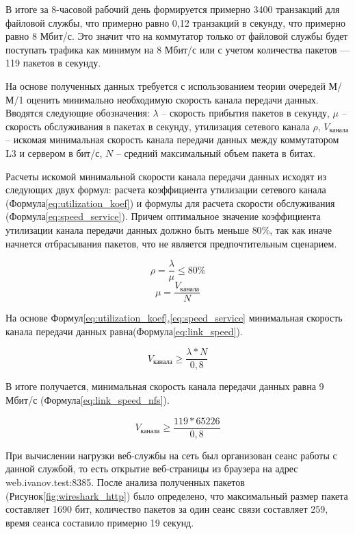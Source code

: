 \documentclass[14pt, a4paper]{extarticle}
\begin{document}
В итоге за 8-часовой рабочий день формируется примерно 3400 транзакций
для файловой службы, что примерно равно 0,12 транзакций в секунду, что
примерно равно 8 Мбит/с. Это значит что на коммутатор только от
файловой службы будет поступать трафика как минимум на 8 Мбит/с или с
учетом количества пакетов --- 119 пакетов в секунду.

На основе полученных данных требуется с использованием теории очередей
М/М/1\cite{query-theory} оценить минимально необходимую скорость
канала передачи данных.  Вводятся следующие обозначения: $\lambda$ –
скорость прибытия пакетов в секунду, $\mu$ – скорость обслуживания в
пакетах в секунду, утилизация сетевого канала $\rho$,
$V_\text{канала}$ – искомая минимальная скорость канала передачи
данных между коммутатором L3 и сервером в бит/с, $N$ – средний
максимальный объем пакета в битах.

Расчеты искомой минимальной скорости канала передачи данных исходят из
следующих двух формул: расчета коэффициента утилизации сетевого
канала (Формула\;\ref{eq:utilization_koef}) и формулы для расчета
скорости обслуживания (Формула\;\ref{eq:speed_service}). Причем
оптимальное значение коэффициента утилизации канала передачи данных
должно быть меньше $80\%$, так как иначе начнется отбрасывания
пакетов, что не является предпочтительным сценарием.

\begin{equation}\label{eq:utilization_koef}
  \rho = \frac{\lambda}{\mu} \leq 80\% 
\end{equation}
\begin{equation}\label{eq:speed_service}
  \mu = \frac{V_\text{канала}}{N}
\end{equation}

На основе Формул\;\ref{eq:utilization_koef},\;\ref{eq:speed_service}
минимальная скорость канала передачи данных
равна(Формула\;\ref{eq:link_speed}).

\begin{equation}\label{eq:link_speed}
  V_\text{канала} \geq \frac{\lambda  * N}{0,8} 
\end{equation}

В итоге получается, минимальная скорость канала передачи данных равна
9 Мбит/с (Формула\;\ref{eq:link_speed_nfs}).

\begin{equation}\label{eq:link_speed_nfs}
  V_\text{канала} \geq \frac{119 * 65226}{0,8}
\end{equation}

При вычислении нагрузки веб-службы на сеть был организован сеанс
работы с данной службой, то есть открытие веб-страницы из браузера на
адрес web.ivanov.test:8385. После анализа полученных пакетов
(Рисунок\;\ref{fig:wireshark_http}) было определено, что максимальный
размер пакета составляет 1690 бит, количество пакетов за один сеанс
связи составляет 259, время сеанса составило примерно 19 секунд.
\end{document}
